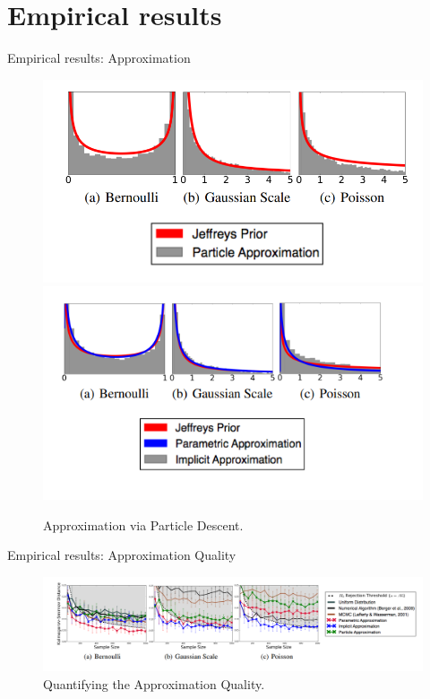 \documentclass{beamer}
\begin{document}
\section{Empirical results}
\begin{frame}{Empirical results: Approximation}
    \begin{figure}
        \centering
        \includegraphics[scale=0.5]{images/bmm_preza.png}
        \includegraphics[scale=0.78]{images/bmm_3.png}
        \caption{Approximation via Particle Descent.}
        \label{fig:enter-label}
    \end{figure}
\end{frame}
\begin{frame}{Empirical results: Approximation Quality}
    \begin{figure}
        \centering
        \includegraphics[scale=0.56]{images/bmm_preza_1.png}
        \caption{Quantifying the Approximation Quality.}
        \label{fig:enter-label}
    \end{figure}
\end{frame}
\end{document}
